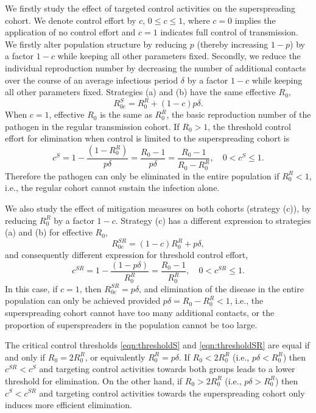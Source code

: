 \documentclass{imammb}
\numberwithin{equation}{section}
\begin{document}
We firstly study the effect of targeted control activities on the superspreading cohort. We denote control effort by $c$, $0\leq c\leq 1$, where $c=0$ implies the application of no control effort and $c=1$ indicates full control of  transmission. We firstly alter population structure by reducing $p$ (thereby increasing $1-p$) by a factor $1-c$ while keeping all other parameters fixed. Secondly, we reduce the individual reproduction number by decreasing the number of additional contacts over the course of an average infectious period $\delta$ by a factor $1-c$ while keeping all other parameters fixed.  Strategies (a) and (b) have the same effective $R_0$,
\begin{equation}\label{eqn:effectiveR0S}
R_{0e}^{S} = R_0^R + (1-c) p \delta.
\end{equation}
When $c=1$, effective $R_0$ is the same as $R_0^R$, the basic reproduction number of the pathogen in the regular transmission cohort. If $R_0 > 1$, the threshold control effort for elimination when control is limited to the superspreading cohort is 
\begin{equation}\label{eqn:thresholdS}
c^{S} = 1 -\frac{ (1-R_0^R)}{p \delta}    = \frac{R_0-1}{p \delta} =\frac{R_0-1}{R_0-R_0^R}, \quad 0< c^{S} \leq 1.
\end{equation}
Therefore the pathogen can only be eliminated in the entire population if $R_0^R < 1$, i.e., the regular cohort cannot sustain the infection alone. 


We also study the effect of mitigation measures on both cohorts (strategy (c)), by reducing $R_0^R$ by a factor $1-c$. Strategy (c) has a different expression to strategies (a) and (b) for effective $R_0$,
\begin{equation}\label{eqn:effectiveR0SR}
R_{0e}^{SR} = (1-c) R_0^R + p \delta, 
\end{equation}
and consequently different expression for threshold control effort,
\begin{equation}\label{eqn:thresholdSR}
c^{SR} = 1 -\frac{ (1-p \delta)}{R_0^R} = \frac{R_0-1}{R_0^R}, \quad 0 < c^{SR} \leq 1.
\end{equation}
In this case, if $c=1$, then $R_{0e}^{SR} = p \delta$, and elimination of the disease in the entire population can only be achieved provided $p \delta = R_0 - R_0^R < 1$, i.e., the superspreading cohort cannot have too many additional contacts, or the proportion of superspreaders in the population cannot be too large. 

The critical control thresholds  \eqref{eqn:thresholdS} and \eqref{eqn:thresholdSR} are equal if and only if $R_0 = 2 R_0^R$, or equivalently $R_0^R = p \delta$. If $R_0< 2 R_0^R$ (i.e., $p\delta <R_0^R$) then $c^{SR}<c^{S}$ and targeting control activities towards both groups leads to a lower threshold for elimination. On the other hand, if $R_0>2R_0^R$ (i.e., $p \delta > R_0^R$) then $c^{S}< c^{SR}$ and targeting control activities towards the superspreading cohort only induces more efficient elimination. %
\end{document}
